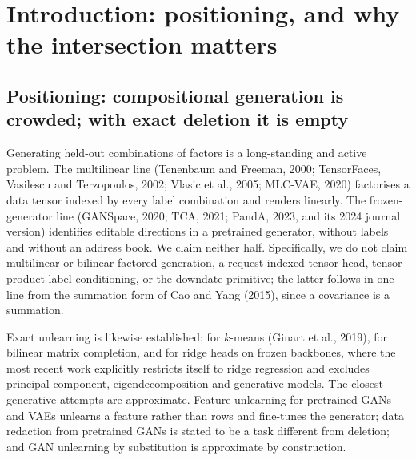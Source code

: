 \documentclass{article} %
\begin{document}
\section{Introduction: positioning, and why the intersection matters}
\label{sec:intro}

\subsection{Positioning: compositional generation is crowded; with exact deletion it is empty}
\label{sec:positioning}

Generating held-out combinations of factors is a long-standing and active problem. The multilinear line (Tenenbaum and Freeman, 2000; TensorFaces,
Vasilescu and Terzopoulos, 2002; Vlasic et al., 2005; MLC-VAE, 2020) factorises a data tensor
indexed by every label combination and renders linearly. The frozen-generator line (GANSpace,
2020; TCA, 2021; PandA, 2023, and its 2024 journal version) identifies editable directions in a
pretrained generator, without labels and without an address book. We claim neither half.
Specifically, we do not claim multilinear or bilinear factored generation, a request-indexed
tensor head, tensor-product label conditioning, or the downdate primitive; the latter follows
in one line from the summation form of Cao and Yang (2015), since a covariance is a summation.

Exact unlearning is likewise established: for $k$-means (Ginart et al., 2019), for bilinear
matrix completion, and for ridge heads on frozen backbones, where the most recent work
explicitly restricts itself to ridge regression and excludes principal-component,
eigendecomposition and generative models. The closest generative attempts are approximate.
Feature unlearning for pretrained GANs and VAEs unlearns a feature rather than rows and
fine-tunes the generator; data redaction from pretrained GANs is stated to be a task different
from deletion; and GAN unlearning by substitution is approximate by construction.
\end{document}
